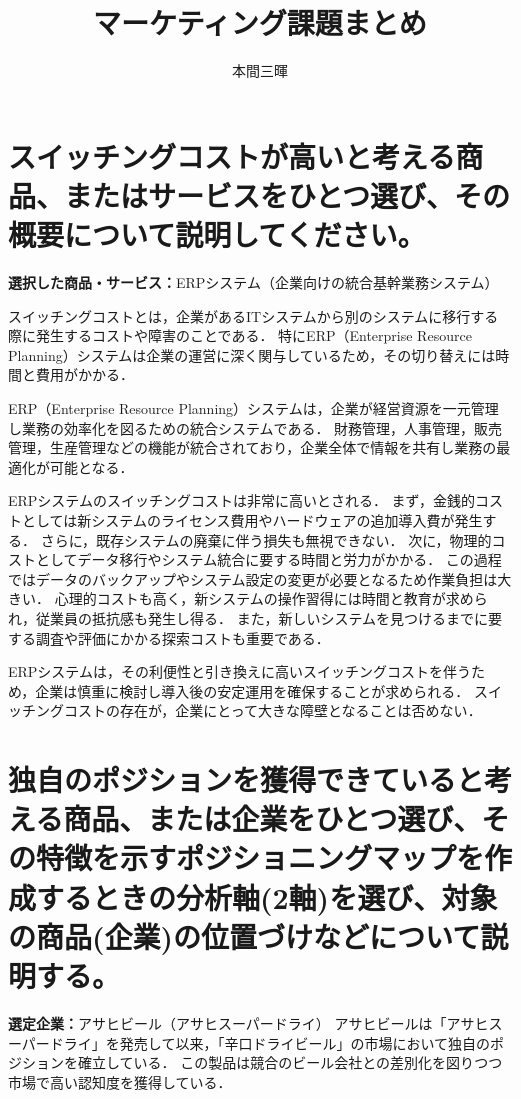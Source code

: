 \documentclass[titlepage,a4paper]{jsarticle}
\title{マーケティング\ajRoman{2}課題まとめ}
\author{本間三暉}
\begin{document}
\maketitle
\section{スイッチングコストが高いと考える商品、またはサービスをひとつ選び、その概要について説明してください。}
\textbf{選択した商品・サービス：}ERPシステム（企業向けの統合基幹業務システム）

スイッチングコストとは，企業があるITシステムから別のシステムに移行する際に発生するコストや障害のことである．
特にERP（Enterprise Resource Planning）システムは企業の運営に深く関与しているため，その切り替えには時間と費用がかかる．

ERP（Enterprise Resource Planning）システムは，企業が経営資源を一元管理し業務の効率化を図るための統合システムである．
財務管理，人事管理，販売管理，生産管理などの機能が統合されており，企業全体で情報を共有し業務の最適化が可能となる．

ERPシステムのスイッチングコストは非常に高いとされる．
まず，金銭的コストとしては新システムのライセンス費用やハードウェアの追加導入費が発生する．
さらに，既存システムの廃棄に伴う損失も無視できない．
次に，物理的コストとしてデータ移行やシステム統合に要する時間と労力がかかる．
この過程ではデータのバックアップやシステム設定の変更が必要となるため作業負担は大きい．
心理的コストも高く，新システムの操作習得には時間と教育が求められ，従業員の抵抗感も発生し得る．
また，新しいシステムを見つけるまでに要する調査や評価にかかる探索コストも重要である\cite{slide1}．

ERPシステムは，その利便性と引き換えに高いスイッチングコストを伴うため，企業は慎重に検討し導入後の安定運用を確保することが求められる．
スイッチングコストの存在が，企業にとって大きな障壁となることは否めない\cite{slide1}．

\section{独自のポジションを獲得できていると考える商品、または企業をひとつ選び、その特徴を示すポジショニングマップを作成するときの分析軸(2軸)を選び、対象の商品(企業)の位置づけなどについて説明する。}
\textbf{選定企業：}アサヒビール（アサヒスーパードライ）
アサヒビールは「アサヒスーパードライ」を発売して以来，「辛口ドライビール」の市場において独自のポジションを確立している\cite{slide1}．
この製品は競合のビール会社との差別化を図りつつ市場で高い認知度を獲得している．
\end{document}
